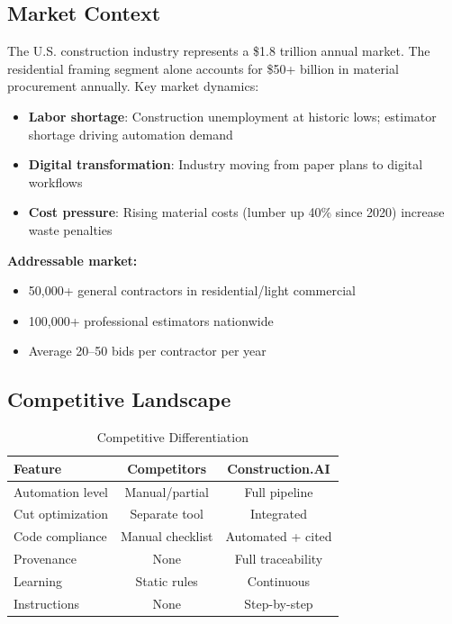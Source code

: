 \subsection{Market Context}

The U.S. construction industry represents a \$1.8 trillion annual market. The residential framing segment alone accounts for \$50+ billion in material procurement annually. Key market dynamics:
\begin{itemize}
  \item \textbf{Labor shortage}: Construction unemployment at historic lows; estimator shortage driving automation demand
  \item \textbf{Digital transformation}: Industry moving from paper plans to digital workflows
  \item \textbf{Cost pressure}: Rising material costs (lumber up 40\% since 2020) increase waste penalties
\end{itemize}

\textbf{Addressable market:}
\begin{itemize}
  \item 50,000+ general contractors in residential/light commercial
  \item 100,000+ professional estimators nationwide
  \item Average 20--50 bids per contractor per year
\end{itemize}

\subsection{Competitive Landscape}

\begin{table}[ht]
\centering
\caption{Competitive Differentiation}
\label{tab:competitors}
\begin{tabular}{lcc}
\toprule
\textbf{Feature} & \textbf{Competitors} & \textbf{Construction.AI} \\
\midrule
Automation level & Manual/partial & Full pipeline \\
Cut optimization & Separate tool & Integrated \\
Code compliance & Manual checklist & Automated + cited \\
Provenance & None & Full traceability \\
Learning & Static rules & Continuous \\
Instructions & None & Step-by-step \\
\bottomrule
\end{tabular}
\end{table}

